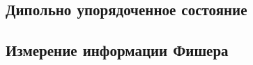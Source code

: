\subsection{Дипольно упорядоченное состояние}


\subsection{Измерение информации Фишера}
% 
% 
% 
% 
% 
% 
% 
% 

